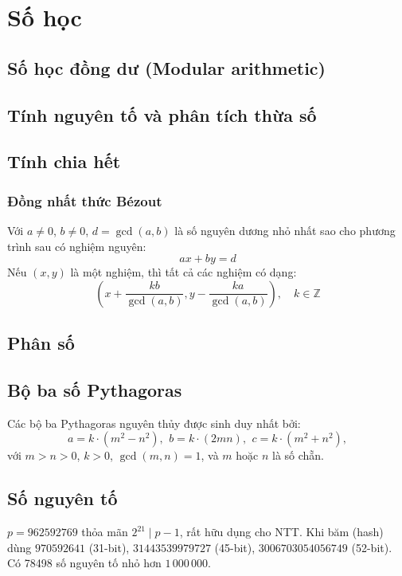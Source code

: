 \chapter{Số học}

\section{Số học đồng dư (Modular arithmetic)}

\section{Tính nguyên tố và phân tích thừa số}

\section{Tính chia hết}

	\subsection{Đồng nhất thức Bézout}
	Với $a \neq 0$, $b \neq 0$, $d=\gcd(a,b)$ là số nguyên dương nhỏ nhất sao cho phương trình sau có nghiệm nguyên:
	$$ax+by=d$$
	Nếu $(x,y)$ là một nghiệm, thì tất cả các nghiệm có dạng:
	$$\left(x+\frac{kb}{\gcd(a,b)}, y-\frac{ka}{\gcd(a,b)}\right), \quad k\in\mathbb{Z}$$


\section{Phân số}

\section{Bộ ba số Pythagoras}
 Các bộ ba Pythagoras nguyên thủy được sinh duy nhất bởi:
 \[ a=k\cdot (m^{2}-n^{2}),\ \,b=k\cdot (2mn),\ \,c=k\cdot (m^{2}+n^{2}), \]
 với $m > n > 0$, $k > 0$, $\gcd(m,n)=1$, và $m$ hoặc $n$ là số chẵn.

\section{Số nguyên tố}
	$p=962592769$ thỏa mãn $2^{21} \mid p-1$, rất hữu dụng cho NTT. Khi băm (hash)
	dùng $970592641$ (31-bit), $31443539979727$ (45-bit), $3006703054056749$
	(52-bit). Có 78498 số nguyên tố nhỏ hơn $1\,000\,000$.


